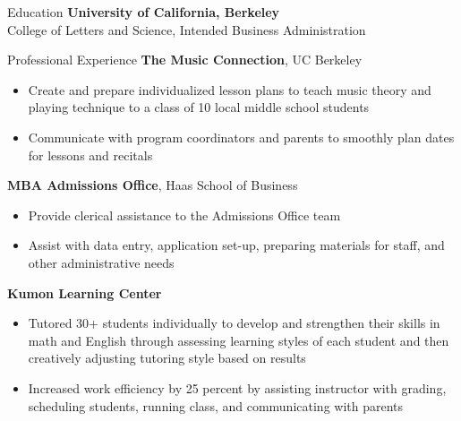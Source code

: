 \documentclass{resume}
\begin{document}
\begin{rSection}{Education}
\textbf{University of California, Berkeley} 
\\College of Letters and Science, Intended Business Administration
\end{rSection}

\begin{rSection}{Professional Experience}
\textbf{The Music Connection}, UC Berkeley
\begin{itemize}
    \item Create and prepare individualized lesson plans to teach music theory and playing technique to a class of 10 local middle school students
    \item Communicate with program coordinators and parents to smoothly plan dates for lessons and recitals
\end{itemize}

\textbf{MBA Admissions Office}, Haas School of Business
\begin{itemize}
    \item Provide clerical assistance to the Admissions Office team
    \item Assist with data entry, application set-up, preparing materials for staff, and other administrative needs
\end{itemize}

\textbf{Kumon Learning Center}
\begin{itemize}
    \item Tutored 30+ students individually to develop and strengthen their skills in math and English through assessing learning styles of each student and then creatively adjusting tutoring style based on results
    \item Increased work efficiency by 25 percent by assisting instructor with grading, scheduling students, running class, and communicating with parents 
\end{itemize}
\end{rSection}
\end{document}
